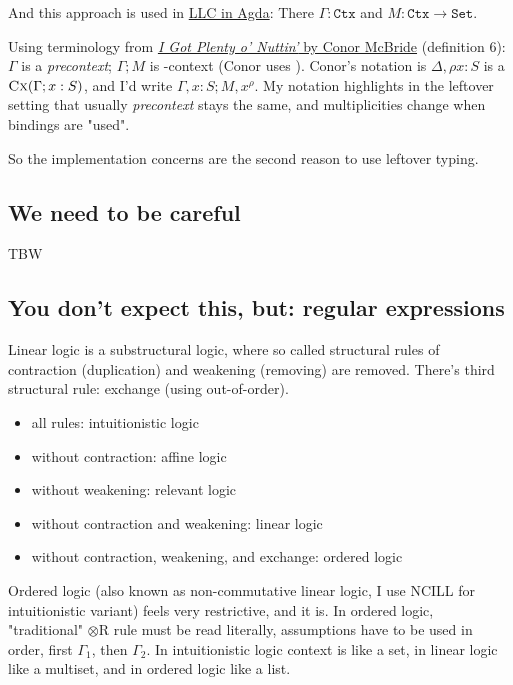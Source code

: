 \documentclass{article}
\begin{document}
And this approach is used in \href{2018-07-12-llc-in-agda.html}{LLC in Agda}: There $\Gamma : \texttt{Ctx}$
and $M : \texttt{Ctx} \to \texttt{Set}$.

Using terminology from \href{https://personal.cis.strath.ac.uk/conor.mcbride/PlentyO-CR.pdf}{\emph{I Got Plenty o’ Nuttin’} by Conor McBride}
(definition 6):
$\Gamma$ is a \emph{precontext}; $\Gamma; M$ is \Gamma-context (Conor uses \Delta).
Conor's notation is $\Delta, \rho x : S$ is a $\textsc{Cx}(\Gamma;x:S)$,
and I'd write $\Gamma, x : S; M, x^\rho$. My notation highlights in the leftover setting
that usually \emph{precontext} stays the same, and multiplicities change when bindings are "used".

So the implementation concerns are the second reason to use leftover typing.

\subsection{We need to be careful}

TBW

\subsection{You don't expect this, but: regular expressions}

Linear logic is a substructural logic, where so called structural rules
of contraction (duplication) and weakening (removing) are removed.
There's third structural rule: exchange (using out-of-order).

\begin{itemize}
  \item all rules: intuitionistic logic
  \item without contraction: affine logic
  \item without weakening: relevant logic
  \item without contraction and weakening: linear logic
  \item without contraction, weakening, and exchange: ordered logic
\end{itemize}

Ordered logic (also known as non-commutative linear logic, I use NCILL for intuitionistic variant)
feels very restrictive, and it is. In ordered logic,
"traditional" ${\otimes}\text{R}$ rule must be read literally,
assumptions have to be used in order, first $\Gamma_1$, then $\Gamma_2$.
In intuitionistic logic context is like a set, in linear logic
like a multiset, and in ordered logic like a list.
\end{document}
